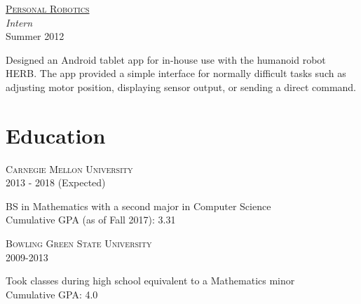 \documentclass[letterpaper,10pt]{article}
\newcommand{\lb}{\vspace{3pt} \\}
\newenvironment{resumecols2}[2]
{
    \vspace{.08cm}
    \begin{minipage}[t]{.22\linewidth}
        \begin{flushright}
            \textsc{#1} \\
            \small{#2}
        \end{flushright}
    \end{minipage}
    \hspace{.005\linewidth}
    \begin{minipage}[t]{.7625\linewidth}
}
{
    \end{minipage}
    \vspace{.08cm}
}
\newenvironment{resumecols}[4]
{
    \vspace{.08cm}
    \begin{minipage}[t]{.22\linewidth}
        \begin{flushright}
            \href{#2}{\textsc{#1}} \\
            \small{\textit{#3}} \\
            \small{#4}
        \end{flushright}
    \end{minipage}
    \hspace{.005\linewidth}
    \begin{minipage}[t]{.7625\linewidth}
}
{
    \end{minipage}
    \vspace{.08cm}
}
\begin{document}
\begin{resumecols}{Personal Robotics}{https://personalrobotics.ri.cmu.edu}{Intern}{Summer 2012}
    Designed an Android tablet app for in-house use with the humanoid robot HERB. The app provided a simple interface for normally difficult tasks such as adjusting motor position, displaying sensor output, or sending a direct command.
\end{resumecols}

\section{Education}

\begin{resumecols2}{Carnegie Mellon University}{2013 - 2018 (Expected)}
    BS in Mathematics with a second major in Computer Science
    \lb
    Cumulative GPA (as of Fall 2017): 3.31
\end{resumecols2}

\begin{resumecols2}{Bowling Green State University}{2009-2013}
    Took classes during high school equivalent to a Mathematics minor
    \lb
    Cumulative GPA: 4.0
\end{resumecols2}
\end{document}
